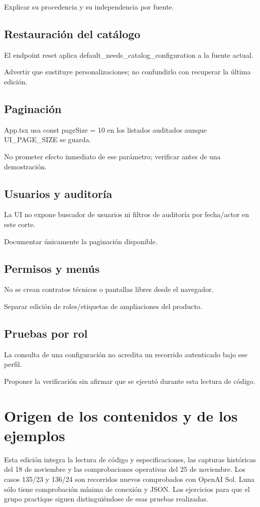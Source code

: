 Explicar su procedencia y su independencia por fuente.

\subsection{Restauración del catálogo}
El endpoint reset aplica default\_\allowbreak{}needs\_\allowbreak{}catalog\_\allowbreak{}configuration a la fuente actual.

Advertir que sustituye personalizaciones; no confundirlo con recuperar la última edición.

\subsection{Paginación}
App.tsx usa const pageSize = 10 en los listados auditados aunque UI\_\allowbreak{}PAGE\_\allowbreak{}SIZE se guarda.

No prometer efecto inmediato de ese parámetro; verificar antes de una demostración.

\subsection{Usuarios y auditoría}
La UI no expone buscador de usuarios ni filtros de auditoría por fecha/actor en este corte.

Documentar únicamente la paginación disponible.

\subsection{Permisos y menús}
No se crean contratos técnicos o pantallas libres desde el navegador.

Separar edición de roles/etiquetas de ampliaciones del producto.

\subsection{Pruebas por rol}
La consulta de una configuración no acredita un recorrido autenticado bajo ese perfil.

Proponer la verificación sin afirmar que se ejecutó durante esta lectura de código.

\section{Origen de los contenidos y de los ejemplos}
Esta edición integra la lectura de código y especificaciones, las capturas históricas del 18 de noviembre y las comprobaciones operativas del 25 de noviembre. Los casos 135/23 y 136/24 son recorridos nuevos comprobados con OpenAI Sol. Luna sólo tiene comprobación mínima de conexión y JSON. Los ejercicios para que el grupo practique siguen distinguiéndose de esas pruebas realizadas.

